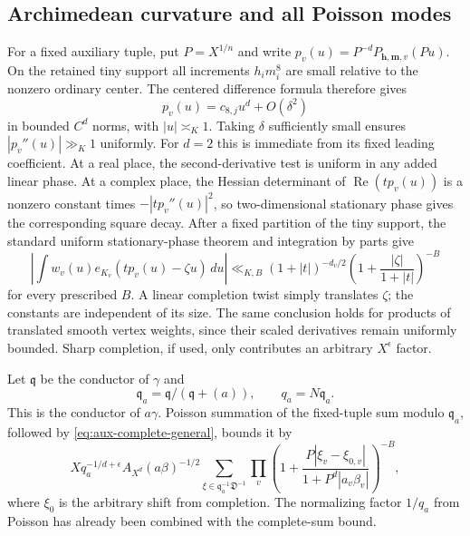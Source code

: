 \documentclass[11pt,reqno]{amsart}
\numberwithin{equation}{section}
\theoremstyle{definition}
\begin{document}
\subsection{Archimedean curvature and all Poisson modes}

For a fixed auxiliary tuple, put $P=X^{1/n}$ and write
$p_v(u)=P^{-d}P_{\mathbf h,\mathbf m,v}(Pu)$.
On the retained tiny support all increments $h_im_i^8$ are small relative
to the nonzero ordinary center.  The centered difference formula therefore
gives
\[
 p_v(u)=c_{8,j}u^d+O(\delta^2)
\]
in bounded $C^d$ norms, with $|u|\asymp_K1$.  Taking $\delta$ sufficiently
small ensures $|p_v''(u)|\gg_K1$ uniformly.  For $d=2$ this is immediate
from its fixed leading coefficient.
At a real place, the second-derivative test is uniform in any added linear
phase.  At a complex place, the Hessian determinant of
$\operatorname{Re}(t p_v(u))$ is a nonzero constant times
$-|t p_v''(u)|^2$, so two-dimensional stationary phase gives the corresponding
square decay.  After a fixed partition of the tiny support, the standard
uniform stationary-phase theorem \cite[\S7.7]{Hormander2003} and integration
by parts give
\begin{equation}\label{eq:aux-arch-tails}
 \left|\int w_v(u)e_{K_v}(t p_v(u)-\zeta u)\,du\right|
 \ll_{K,B}(1+|t|)^{-d_v/2}
       \left(1+\frac{|\zeta|}{1+|t|}\right)^{-B}
\end{equation}
for every prescribed $B$.  A linear completion twist simply translates
$\zeta$; the constants are independent of its size.  The same conclusion
holds for products of translated smooth vertex weights, since their
scaled derivatives remain uniformly bounded.  Sharp completion, if used,
only contributes an arbitrary $X^\epsilon$ factor.

Let $\mathfrak q$ be the conductor of $\gamma$ and
\[
 \mathfrak q_a=\mathfrak q/(\mathfrak q+(a)),\qquad q_a=N\mathfrak q_a.
\]
This is the conductor of $a\gamma$.
Poisson summation of the fixed-tuple sum modulo $\mathfrak q_a$, followed
by \eqref{eq:aux-complete-general}, bounds it by
\[
 Xq_a^{-1/d+\epsilon}A_{X^d}(a\beta)^{-1/2}
 \sum_{\xi\in\mathfrak q_a^{-1}\mathfrak D^{-1}}
 \prod_v\left(1+
   \frac{P|\xi_v-\xi_{0,v}|}{1+P^d|a_v\beta_v|}\right)^{-B},
\]
where $\xi_0$ is the arbitrary shift from completion.
The normalizing factor $1/q_a$ from Poisson has already been combined
with the complete-sum bound.
\end{document}
